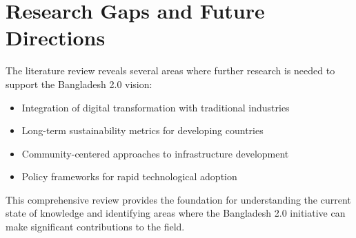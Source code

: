\section{Research Gaps and Future Directions}

The literature review reveals several areas where further research is needed to support the Bangladesh 2.0 vision:

\begin{itemize}
    \item Integration of digital transformation with traditional industries
    \item Long-term sustainability metrics for developing countries
    \item Community-centered approaches to infrastructure development
    \item Policy frameworks for rapid technological adoption
\end{itemize}

This comprehensive review provides the foundation for understanding the current state of knowledge and identifying areas where the Bangladesh 2.0 initiative can make significant contributions to the field.